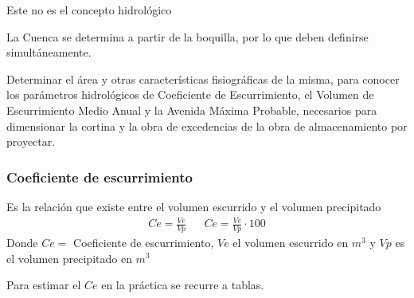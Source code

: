 Este no es el concepto hidrológico

La Cuenca se determina a partir de la boquilla, por lo que deben definirse simultáneamente.

Determinar el área y otras características fisiográficas de la misma, para conocer los parámetros hidrológicos de Coeficiente de Escurrimiento, el Volumen de Escurrimiento Medio Anual y la Avenida Máxima Probable, necesarios para dimensionar la cortina y la obra de excedencias de la obra de almacenamiento por proyectar.

\subsubsection{Coeficiente de escurrimiento}

Es la relación que existe entre el volumen escurrido y el volumen precipitado
\begin{align*}
    Ce = \frac{Ve}{Vp}&& Ce = \frac{Ve}{Vp}\cdot 100
\end{align*}
Donde $Ce=$ Coeficiente de escurrimiento, $Ve$ el volumen escurrido en $m^3$ y $Vp$ es el volumen precipitado en $m^3$

Para estimar el $Ce$ en la práctica se recurre a tablas.

